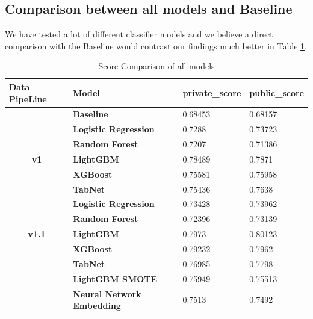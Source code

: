 \documentclass[sigconf, nonacm]{acmart}
\begin{document}
\subsection{Comparison between all models and Baseline}

We have tested a lot of different classifier models and we believe a direct comparison with the Baseline would contrast our findings much better in Table \ref{tab:all}.

\begin{table}[t]
    \caption{Score Comparison of all models}
    \label{tab:all}
    \begin{tabular}{@{}|c|l|l|l|@{}}
        \toprule
\multicolumn{1}{|l|}{\textbf{Data   PipeLine}} & \textbf{Model}                                                & \textbf{private\_score} & \textbf{public\_score} \\ \midrule
\multicolumn{1}{|l|}{\textbf{}} & \textbf{Baseline}            & 0.68453 & 0.68157 \\ \midrule
\multirow{5}{*}{\textbf{v1}}    & \textbf{Logistic Regression} & 0.7288  & 0.73723 \\ \cmidrule(l){2-4} 
                                & \textbf{Random Forest}       & 0.7207  & 0.71386 \\ \cmidrule(l){2-4} 
                                & \textbf{LightGBM}            & 0.78489 & 0.7871  \\ \cmidrule(l){2-4} 
                                & \textbf{XGBoost}             & 0.75581 & 0.75958 \\ \cmidrule(l){2-4} 
                                & \textbf{TabNet}              & 0.75436 & 0.7638  \\ \midrule
\multirow{5}{*}{\textbf{v1.1}}  & \textbf{Logistic Regression} & 0.73428 & 0.73962 \\ \cmidrule(l){2-4} 
                                & \textbf{Random Forest}       & 0.72396 & 0.73139 \\ \cmidrule(l){2-4} 
                                & \textbf{LightGBM}            & 0.7973  & 0.80123 \\ \cmidrule(l){2-4} 
                                & \textbf{XGBoost}             & 0.79232 & 0.7962  \\ \cmidrule(l){2-4} 
                                & \textbf{TabNet}              & 0.76985 & 0.7798  \\ \midrule
\multicolumn{1}{|l|}{\textbf{}} & \textbf{LightGBM SMOTE}      & 0.75949 & 0.75513 \\ \midrule
\multicolumn{1}{|l|}{\textbf{}}                & \textbf{Neural Network   Embedding}                           & 0.7513                  & 0.7492                 \\ \midrule

\end{tabular}
\end{table}
\end{document}
